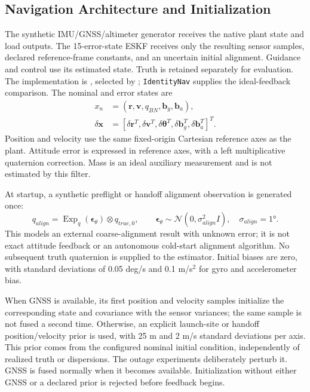 \subsection{Navigation Architecture and Initialization}\label{sec:nav-architecture}
The synthetic IMU/GNSS/altimeter generator receives the native plant state and load
outputs. The 15-error-state ESKF receives only the resulting sensor samples, declared
reference-frame constants, and an uncertain initial alignment. Guidance and control use
its estimated state. Truth is retained separately for evaluation. The implementation is
, selected by
; \texttt{IdentityNav} supplies the ideal-feedback
comparison. The nominal and error states are
\begin{align}
 x_n&=(\bm r,\bm v,q_{BN},\bm b_g,\bm b_a),\\
 \delta\bm x&=[\delta\bm r^T,\delta\bm v^T,\delta\bm\theta^T,
                  \delta\bm b_g^T,\delta\bm b_a^T]^T.
\end{align}
Position and velocity use the same fixed-origin Cartesian reference axes as the plant.
Attitude error is expressed in reference axes, with a left multiplicative quaternion
correction. Mass is an ideal auxiliary measurement and is not estimated by this filter.

At startup, a synthetic preflight or handoff alignment observation is generated once:
\begin{equation}
 q_{align}=\operatorname{Exp}_q(\bm\epsilon_\theta)\otimes q_{true,0},
 \qquad\bm\epsilon_\theta\sim\mathcal N(0,\sigma_{align}^2 I),\quad
 \sigma_{align}=\ang{1}.
\end{equation}
This models an external coarse-alignment result with unknown error; it is not exact
attitude feedback or an autonomous cold-start alignment algorithm. No subsequent truth
quaternion is supplied to the estimator. Initial biases are zero, with standard
deviations of 0.05 deg/s and 0.1 m/s$^2$ for gyro and accelerometer bias.

When GNSS is available, its first position and velocity samples initialize the corresponding
state and covariance with the sensor variances; the same sample is not fused a second
time. Otherwise, an explicit launch-site or handoff position/velocity prior is used,
with 25 m and 2 m/s standard deviations per axis. This prior comes from the configured
nominal initial condition, independently of realized truth or dispersions. The outage
experiments deliberately perturb it. GNSS is fused normally when it becomes available.
Initialization without either GNSS or a declared prior is rejected before feedback begins.

